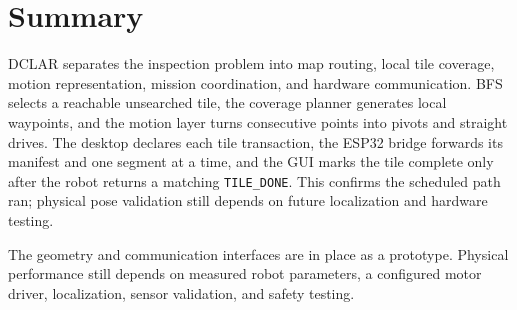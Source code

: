\documentclass{article}
\begin{document}
\section{Summary}

DCLAR separates the inspection problem into map routing, local tile coverage, motion representation, mission coordination, and hardware communication. BFS selects a reachable unsearched tile, the coverage planner generates local waypoints, and the motion layer turns consecutive points into pivots and straight drives. The desktop declares each tile transaction, the ESP32 bridge forwards its manifest and one segment at a time, and the GUI marks the tile complete only after the robot returns a matching \texttt{TILE\_DONE}. This confirms the scheduled path ran; physical pose validation still depends on future localization and hardware testing.

The geometry and communication interfaces are in place as a prototype. Physical performance still depends on measured robot parameters, a configured motor driver, localization, sensor validation, and safety testing.
\end{document}
